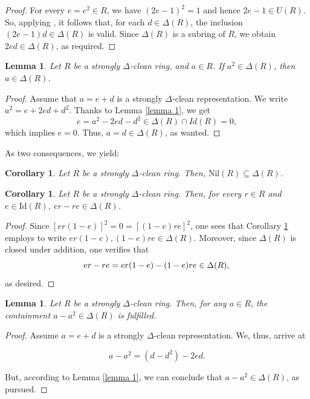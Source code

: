 \documentclass[12pt]{amsart}
\newtheorem{lemma}[theorem]{Lemma}
\newtheorem{corollary}[theorem]{Corollary}
\theoremstyle{definition}
\begin{document}
\begin{proof}
For every \( e = e^2 \in R \), we have $(2e-1)^2=1$ and hence \(2e-1\in U(R) \). So, applying \cite[Lemma 1(2)]{lmr}, it follows that, for each \( d \in \Delta(R) \), the inclusion \((2e-1)d\in \Delta(R) \) is valid. Since \( \Delta(R) \) is a subring of \( R \), we obtain \( 2ed \in \Delta(R) \), as required.
\end{proof}

\begin{lemma} \label{lemma 2}
Let \( R \) be a strongly $\Delta$-clean ring, and \( a \in R \). If \( a^2 \in \Delta(R) \), then \( a \in \Delta(R) \).
\end{lemma}

\begin{proof}
Assume that \( a = e + d \) is a strongly $\Delta$-clean representation. We write \( a^2 = e + 2ed + d^2 \). Thanks to Lemma \ref{lemma 1}, we get \[ e = a^2 - 2ed - d^2 \in \Delta(R) \cap Id(R) = 0 ,\] which implies \( e = 0 \). Thus, \( a = d \in \Delta(R) \), as wanted.
\end{proof}

As two consequences, we yield:

\begin{corollary} \label{subset nil}
Let \( R \) be a strongly $\Delta$-clean ring. Then, \( \text{Nil}(R) \subseteq \Delta(R) \).
\end{corollary}

\begin{corollary} \label{com idim}
Let $R$ be a strongly $\Delta$-clean ring. Then, for every $r \in R$ and $e \in \mathrm{Id}(R)$, $er - re \in \Delta(R)$.
\end{corollary}

\begin{proof}
Since $[er(1-e)]^2 = 0 = [(1-e)re]^2$, one sees that Corollary \ref{subset nil} employs to write $er(1-e), (1-e)re \in \Delta(R)$. Moreover, since $\Delta(R)$ is closed under addition, one verifies that
\[
er - re = er(1-e) - (1-e)re \in \Delta(R), \qedhere
\]
as desired.
\end{proof}

\begin{lemma} \label{lemma 3}
Let \( R \) be a strongly $\Delta$-clean ring. Then, for any \( a \in R \), the containment \( a - a^2 \in \Delta(R) \) is fulfilled.
\end{lemma}

\begin{proof}
Assume \( a = e + d \) is a strongly $\Delta$-clean representation. We, thus, arrive at

\[ a - a^2 = (d - d^2) - 2ed. \]

But, according to Lemma \ref{lemma 1}, we can conclude that \( a - a^2 \in \Delta(R) \), as pursued.
\end{proof}
\end{document}
